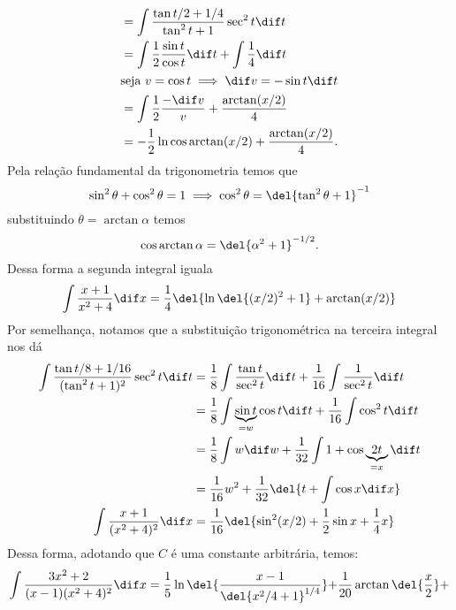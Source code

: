 \documentclass{IMTexam}
\begin{document}
\begin{questions}
\begin{enumerate}[label=(\roman*)]
\begin{solution}
\begin{align*}
                    &=\int \dfrac{\tan t/2+1/4}{\tan^2 t+1}\sec^2 t \dif t\\
                    &=\int \dfrac{1}{2}\dfrac{\sin t}{\cos t}\dif t+\int\dfrac{1}{4}\dif t\\
                    \intertext{seja $v = \cos t \implies \dif v = -\sin t \dif t$}
                    &=\int \dfrac{1}{2}\dfrac{-\dif v}{v}+\dfrac{\arctan (x/2)}{4}\\
                    &=-\dfrac{1}{2}\ln \cos\arctan (x/2)+\dfrac{\arctan (x/2)}{4}.
                \end{align*}
                Pela relação fundamental da trigonometria temos que
                \[ \sin^2\theta+\cos^2\theta = 1\implies \cos^2 \theta=\del{\tan^2 \theta+1}^{-1} \]
                substituindo $\theta = \arctan \alpha$ temos
                \begin{equation}\label{eq:cosarctan}
                    \cos\arctan \alpha=\del{\alpha^2 + 1}^{-1/2}.
                \end{equation}
                Dessa forma a segunda integral iguala
                \[ \int \dfrac{x+1}{x^2+4}\dif x=\dfrac{1}{4}\del{\ln \del{(x/2)^2+1}+\arctan (x/2)} \]
                Por semelhança, notamos que a substituição trigonométrica na terceira integral nos dá
                \begin{align*}
                    \int\dfrac{\tan t/8+1/16}{(\tan^2 t+1)^2}\sec^2 t\dif
                    t&=\dfrac{1}{8}\int\dfrac{\tan t}{\sec^2 t}\dif t+
                    \dfrac{1}{16}\int\dfrac{1}{\sec^2 t} \dif t\\
                    &=\dfrac{1}{8}\int\underbrace{\sin t}_{=w} \cos t\dif t+ \dfrac{1}{16}\int \cos^2 t \dif t\\
                    &=\dfrac{1}{8}\int w \dif w +\dfrac{1}{32}\int 1 + \cos \underbrace{2t}_{=x} \dif t\\
                    &=\dfrac{1}{16} w^2 +\dfrac{1}{32}\del{t+\int \cos x \dif x}\\
                    \int\dfrac{x+1}{(x^2+4)^2}\dif x&=\dfrac{1}{16}\del{\sin^2
                    (x/2)+\dfrac{1}{2}\sin x +\dfrac{1}{4}x}
                \end{align*}
                Dessa forma, adotando que $C$ é uma constante arbitrária, temos:
                \[ \begin{split}
                    \int \dfrac{3x^2+2}{(x-1)(x^2+4)^2}\dif x=
                    \dfrac{1}{5}\ln\del{\dfrac{x-1}{\del{x^2/4+1}^{1/4}}}+
                    &\dfrac{1}{20}\arctan\del{\dfrac{x}{2}}+\\

\end{split}\]
\end{solution}
\end{enumerate}
\end{questions}
\end{document}
